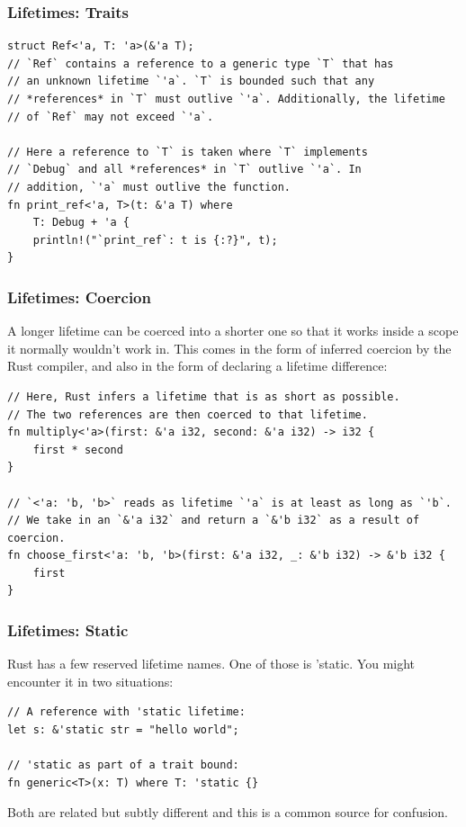 \documentclass[aspectratio=1610,t]{beamer}
\begin{document}

\begin{frame}[fragile]
\frametitle{Lifetimes: Traits}
\begin{verbatim}
struct Ref<'a, T: 'a>(&'a T);
// `Ref` contains a reference to a generic type `T` that has
// an unknown lifetime `'a`. `T` is bounded such that any
// *references* in `T` must outlive `'a`. Additionally, the lifetime
// of `Ref` may not exceed `'a`.

// Here a reference to `T` is taken where `T` implements
// `Debug` and all *references* in `T` outlive `'a`. In
// addition, `'a` must outlive the function.
fn print_ref<'a, T>(t: &'a T) where
    T: Debug + 'a {
    println!("`print_ref`: t is {:?}", t);
}
\end{verbatim}
\end{frame}


\begin{frame}[fragile]
\frametitle{Lifetimes: Coercion}

A longer lifetime can be coerced into a shorter one so that it works inside a scope it normally wouldn't work in. This comes in the form of inferred coercion by the Rust compiler, and also in the form of declaring a lifetime difference:
\begin{verbatim}
// Here, Rust infers a lifetime that is as short as possible.
// The two references are then coerced to that lifetime.
fn multiply<'a>(first: &'a i32, second: &'a i32) -> i32 {
    first * second
}

// `<'a: 'b, 'b>` reads as lifetime `'a` is at least as long as `'b`.
// We take in an `&'a i32` and return a `&'b i32` as a result of coercion.
fn choose_first<'a: 'b, 'b>(first: &'a i32, _: &'b i32) -> &'b i32 {
    first
}
\end{verbatim}
\end{frame}


\begin{frame}[fragile]
\frametitle{Lifetimes: Static}

Rust has a few reserved lifetime names. One of those is 'static. You might encounter it in two situations:
\begin{verbatim}
// A reference with 'static lifetime:
let s: &'static str = "hello world";

// 'static as part of a trait bound:
fn generic<T>(x: T) where T: 'static {}
\end{verbatim}
Both are related but subtly different and this is a common source for confusion.
\end{frame}
\end{document}
